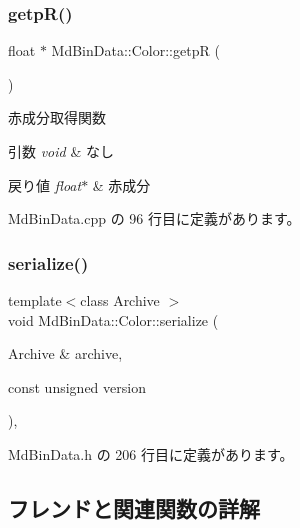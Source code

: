\subsubsection{\texorpdfstring{getp\+R()}{getpR()}}
{\footnotesize\ttfamily float $\ast$ Md\+Bin\+Data\+::\+Color\+::getpR (\begin{DoxyParamCaption}{ }\end{DoxyParamCaption})}



赤成分取得関数 


\begin{DoxyParams}{引数}
{\em void} & なし \\
\hline
\end{DoxyParams}

\begin{DoxyRetVals}{戻り値}
{\em float$\ast$} & 赤成分 \\
\hline
\end{DoxyRetVals}


 Md\+Bin\+Data.\+cpp の 96 行目に定義があります。

\mbox{\label{class_md_bin_data_1_1_color_a7442aa5a639d3324010bb56f6db2a5fc}} 
\subsubsection{\texorpdfstring{serialize()}{serialize()}}
{\footnotesize\ttfamily template$<$class Archive $>$ \\
void Md\+Bin\+Data\+::\+Color\+::serialize (\begin{DoxyParamCaption}\item[{Archive \&}]{archive,  }\item[{const unsigned}]{version }\end{DoxyParamCaption})\hspace{0.3cm}{\ttfamily [inline]}, {\ttfamily [private]}}



 Md\+Bin\+Data.\+h の 206 行目に定義があります。



\subsection{フレンドと関連関数の詳解}
\mbox{\label{class_md_bin_data_1_1_color_ac98d07dd8f7b70e16ccb9a01abf56b9c}} 

